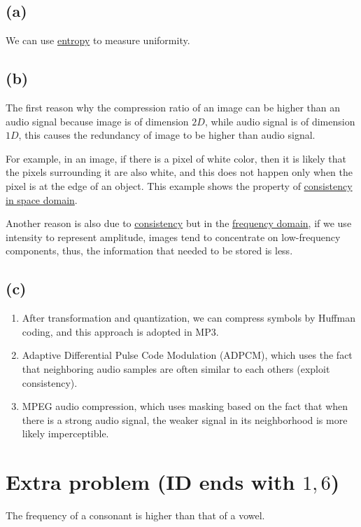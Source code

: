 \documentclass{article}
\begin{document}
\subsection*{(a)}

We can use \underline{entropy} to measure uniformity.

\subsection*{(b)}

The first reason why the compression ratio of an image can be higher than an audio signal because image is of dimension $2D$,
while audio signal is of dimension $1D$, this causes the redundancy of image to be higher than audio signal.
\bigskip

For example, in an image, if there is a pixel of white color, then it is likely that the pixels surrounding it are also white,
and this does not happen only when the pixel is at the edge of an object. This example shows the property of \underline{consistency in space domain}.
\bigskip

Another reason is also due to \underline{consistency} but in the \underline{frequency domain}, 
if we use intensity to represent amplitude, images tend to concentrate on low-frequency components, 
thus, the information that needed to be stored is less.

\subsection*{(c)}

\begin{enumerate}
    \item After transformation and quantization, we can compress symbols by Huffman coding, and this approach is adopted in MP3.
    \item Adaptive Differential Pulse Code Modulation (ADPCM), which uses the fact that neighboring audio samples are often similar to each others (exploit consistency).
    \item MPEG audio compression, which uses masking based on the fact that when there is a strong audio signal, the weaker signal in its neighborhood is more likely imperceptible.
\end{enumerate}

\section*{Extra problem (ID ends with $1, 6$)}

The frequency of a consonant is higher than that of a vowel.
\end{document}
